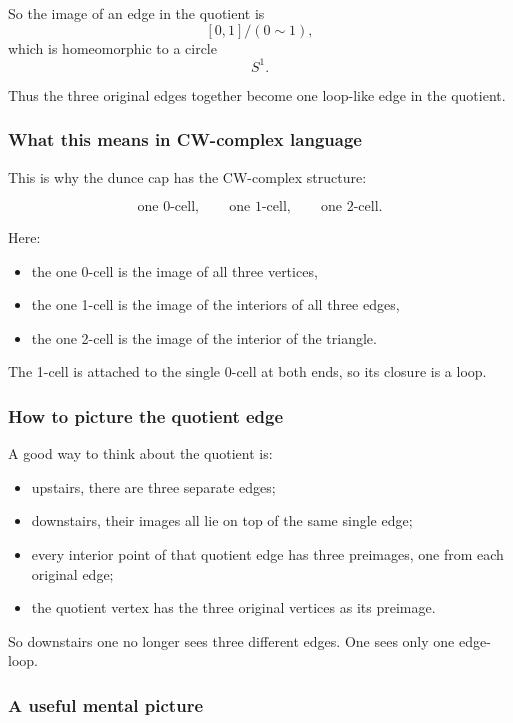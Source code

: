 \documentclass[12pt,a4paper]{article}
\theoremstyle{notespace}
\begin{document}
So the image of an edge in the quotient is
\[
[0,1]/(0\sim 1),
\]
which is homeomorphic to a circle
\[
S^1.
\]

Thus the three original edges together become one loop-like edge in the quotient.

\subsubsection{What this means in CW-complex language}

This is why the dunce cap has the CW-complex structure:

\[
\text{one 0-cell},\qquad
\text{one 1-cell},\qquad
\text{one 2-cell}.
\]

Here:

\begin{itemize}
	\item the one 0-cell is the image of all three vertices,
	\item the one 1-cell is the image of the interiors of all three edges,
	\item the one 2-cell is the image of the interior of the triangle.
\end{itemize}

The 1-cell is attached to the single 0-cell at both ends, so its closure is a loop.

\subsubsection{How to picture the quotient edge}

A good way to think about the quotient is:

\begin{itemize}
	\item upstairs, there are three separate edges;
	\item downstairs, their images all lie on top of the same single edge;
	\item every interior point of that quotient edge has three preimages, one from each original edge;
	\item the quotient vertex has the three original vertices as its preimage.
\end{itemize}

So downstairs one no longer sees three different edges. One sees only one edge-loop.

\subsubsection{A useful mental picture}
\end{document}
